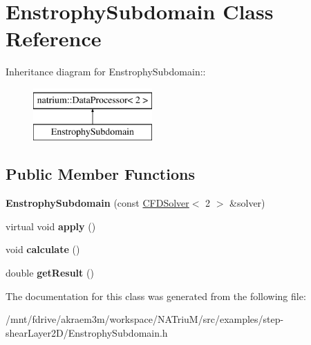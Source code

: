 \hypertarget{classEnstrophySubdomain}{
\section{EnstrophySubdomain Class Reference}
\label{classEnstrophySubdomain}
}
Inheritance diagram for EnstrophySubdomain::\begin{figure}[H]
\begin{center}
\leavevmode
\includegraphics[height=2cm]{classEnstrophySubdomain}
\end{center}
\end{figure}
\subsection*{Public Member Functions}
\begin{DoxyCompactItemize}
\item 
\hypertarget{classEnstrophySubdomain_a75152169f142ed633e052b40681ec2ea}{
{\bfseries EnstrophySubdomain} (const \hyperlink{classnatrium_1_1CFDSolver}{CFDSolver}$<$ 2 $>$ \&solver)}
\label{classEnstrophySubdomain_a75152169f142ed633e052b40681ec2ea}

\item 
\hypertarget{classEnstrophySubdomain_a36154ebc6ad71ccd48a5aa007b337ba8}{
virtual void {\bfseries apply} ()}
\label{classEnstrophySubdomain_a36154ebc6ad71ccd48a5aa007b337ba8}

\item 
\hypertarget{classEnstrophySubdomain_aafe2be1be379d8bc9b187f5ea25c97ef}{
void {\bfseries calculate} ()}
\label{classEnstrophySubdomain_aafe2be1be379d8bc9b187f5ea25c97ef}

\item 
\hypertarget{classEnstrophySubdomain_a88a1075792a0c74d6d812009f37a3ef2}{
double {\bfseries getResult} ()}
\label{classEnstrophySubdomain_a88a1075792a0c74d6d812009f37a3ef2}

\end{DoxyCompactItemize}


The documentation for this class was generated from the following file:\begin{DoxyCompactItemize}
\item 
/mnt/fdrive/akraem3m/workspace/NATriuM/src/examples/step-\/shearLayer2D/EnstrophySubdomain.h\end{DoxyCompactItemize}
